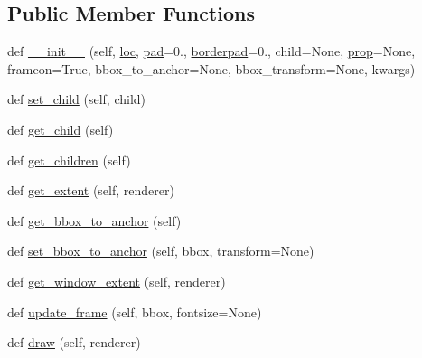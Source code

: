 \subsection*{Public Member Functions}
\begin{DoxyCompactItemize}
\item 
def \hyperlink{classmatplotlib_1_1offsetbox_1_1AnchoredOffsetbox_ad90b11188ace543612a1d75702560034}{\+\_\+\+\_\+init\+\_\+\+\_\+} (self, \hyperlink{classmatplotlib_1_1offsetbox_1_1AnchoredOffsetbox_acff8512cc529c0576658d3d3102f68ad}{loc}, \hyperlink{classmatplotlib_1_1offsetbox_1_1AnchoredOffsetbox_a31d7295c4ca96c77f4bd5695fe094357}{pad}=0., \hyperlink{classmatplotlib_1_1offsetbox_1_1AnchoredOffsetbox_a50d24143d0fabb11a481b3d85b62a19a}{borderpad}=0., child=None, \hyperlink{classmatplotlib_1_1offsetbox_1_1AnchoredOffsetbox_aa66f860ff37b423d0cd90d61605702ef}{prop}=None, frameon=True, bbox\+\_\+to\+\_\+anchor=None, bbox\+\_\+transform=None, kwargs)
\item 
def \hyperlink{classmatplotlib_1_1offsetbox_1_1AnchoredOffsetbox_af7f716fb6c070da8478cf642f9c94967}{set\+\_\+child} (self, child)
\item 
def \hyperlink{classmatplotlib_1_1offsetbox_1_1AnchoredOffsetbox_a7209c7f2fd68842b28d39661f2f83696}{get\+\_\+child} (self)
\item 
def \hyperlink{classmatplotlib_1_1offsetbox_1_1AnchoredOffsetbox_ad2a953b2b249589ef60e84d3bc7db358}{get\+\_\+children} (self)
\item 
def \hyperlink{classmatplotlib_1_1offsetbox_1_1AnchoredOffsetbox_a84a8fb573a7af54738404268b761f2dd}{get\+\_\+extent} (self, renderer)
\item 
def \hyperlink{classmatplotlib_1_1offsetbox_1_1AnchoredOffsetbox_a2b1d36f83c643619327fb9134f251bfb}{get\+\_\+bbox\+\_\+to\+\_\+anchor} (self)
\item 
def \hyperlink{classmatplotlib_1_1offsetbox_1_1AnchoredOffsetbox_a232db57c6a54de121f63ccb1ca3d8878}{set\+\_\+bbox\+\_\+to\+\_\+anchor} (self, bbox, transform=None)
\item 
def \hyperlink{classmatplotlib_1_1offsetbox_1_1AnchoredOffsetbox_a70e66e6cbc52622c93bafe464f95aab2}{get\+\_\+window\+\_\+extent} (self, renderer)
\item 
def \hyperlink{classmatplotlib_1_1offsetbox_1_1AnchoredOffsetbox_a7459ed38d3d1a5103509b1bf2720d64e}{update\+\_\+frame} (self, bbox, fontsize=None)
\item 
def \hyperlink{classmatplotlib_1_1offsetbox_1_1AnchoredOffsetbox_ab5da8b632c3bb3421a94cb1ec8db2691}{draw} (self, renderer)
\end{DoxyCompactItemize}
